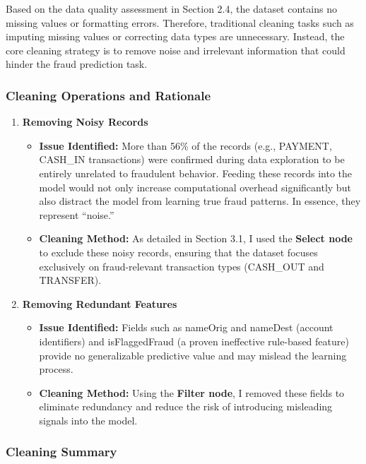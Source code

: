 \documentclass[sigplan,screen]{acmart}
\begin{document}
Based on the data quality assessment in Section 2.4, the dataset contains no missing values or formatting errors. Therefore, traditional cleaning tasks such as imputing missing values or correcting data types are unnecessary. Instead, the core cleaning strategy is to remove noise and irrelevant information that could hinder the fraud prediction task.
    
\subsubsection{Cleaning Operations and Rationale}
    
\begin{enumerate}
\item \textbf{Removing Noisy Records}
    \begin{itemize}
    \item \textbf{Issue Identified:} More than 56\% of the records (e.g., PAYMENT, CASH\_IN transactions) were confirmed during data exploration to be entirely unrelated to fraudulent behavior. Feeding these records into the model would not only increase computational overhead significantly but also distract the model from learning true fraud patterns. In essence, they represent ``noise.''
    \item \textbf{Cleaning Method:} As detailed in Section 3.1, I used the \textbf{Select node} to exclude these noisy records, ensuring that the dataset focuses exclusively on fraud-relevant transaction types (CASH\_OUT and TRANSFER).
    \end{itemize}
\item \textbf{Removing Redundant Features}
    \begin{itemize}
    \item \textbf{Issue Identified:} Fields such as nameOrig and nameDest (account identifiers) and isFlaggedFraud (a proven ineffective rule-based feature) provide no generalizable predictive value and may mislead the learning process.
    \item \textbf{Cleaning Method:} Using the \textbf{Filter node}, I removed these fields to eliminate redundancy and reduce the risk of introducing misleading signals into the model.
    \end{itemize}
\end{enumerate}
    
\subsubsection{Cleaning Summary}
    
\end{document}
